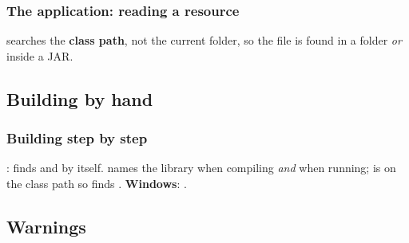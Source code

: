 \documentclass[aspectratio=169,10pt,compress]{beamer}
\newcommand{\win}{\textbf{Windows}}
\begin{document}
\begin{frame}[t,fragile] \frametitle{The application: reading a resource}

  \vspace{0.1em}
  \small {} searches the \textbf{class path}, not the current folder,
  so the file is found in a folder \emph{or} inside a JAR.
\end{frame}

\subsection[By hand]{Building by hand}




\begin{frame}[t,fragile] \frametitle{Building step by step}

  \vspace{0.1em}
  \small
  :  finds  and  by itself.  names the library
  when compiling \emph{and} when running;  is on the class path so  finds .
  \win: .
\end{frame}


\subsection[Lint]{Warnings}
\end{document}
